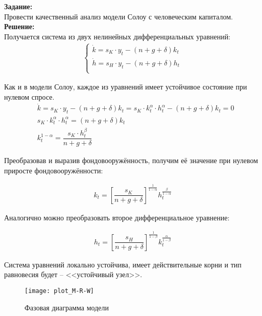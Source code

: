 \textbf{Задание:}\\
Провести качественный анализ модели Солоу с человеческим капиталом.\\

\textbf{Решение:}\\
Получается система из двух нелинейных дифференциальных уравнений:
\begin{align*}
	\begin{cases}
		\dot{k} = s_K \cdot y_t - (n + g + \delta) k_t\\
		\dot{h} = s_H \cdot y_t - (n + g + \delta) h_t\\
	\end{cases}
\end{align*}

Как и в модели Солоу, каждое из уравнений имеет устойчивое состояние при нулевом спросе.
\begin{align*}
	& \dot{k} = s_K \cdot y_t - (n + g + \delta) k_t = s_K \cdot k_t^\alpha \cdot h_t^\alpha - (n + g + \delta) k_t = 0\\
	& s_K \cdot k_t^\alpha \cdot h_t^\alpha = (n + g + \delta) k_t\\
	& k_t^{1-\alpha} = \dfrac{s_K \cdot h_t^\beta}{n + g + \delta}
\end{align*}

Преобразовав и выразив фондовооружённость, получим её значение при нулевом приросте фондовооружённости:
\begin{ceqn}
	\begin{align*}
		k_t = \left[\dfrac{s_K}{n + g + \delta}\right]^{\frac{1}{1-\alpha}} h_t^{\frac{\beta}{1-\alpha}}
	\end{align*}
\end{ceqn}

Аналогично можно преобразовать второе дифференциальное уравнение:
\begin{ceqn}
	\begin{align*}
		h_t = \left[\dfrac{s_H}{n + g + \delta}\right]^{\frac{1}{1-\beta}} k_t^{\frac{\alpha}{1-\beta}}
	\end{align*}
\end{ceqn}

Система уравнений локально устойчива, имеет действительные корни и тип равновесия будет -- <<устойчивый узел>>.

\begin{figure}[h]
	\centering \texttt{[image: plot\_M-R-W]}
	\caption{Фазовая диаграмма модели}
	\label{fig:plot_M-R-W}
\end{figure}

